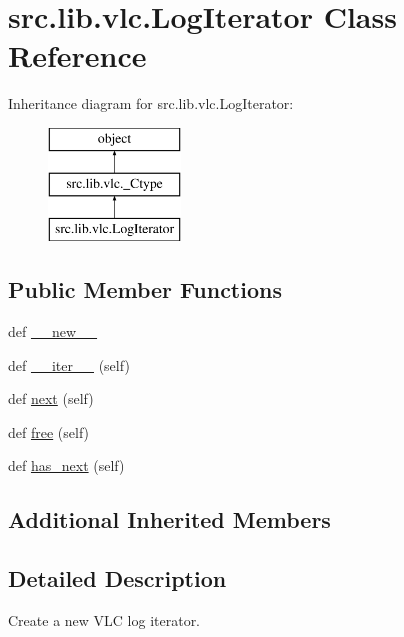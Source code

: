 \hypertarget{classsrc_1_1lib_1_1vlc_1_1LogIterator}{}\section{src.\+lib.\+vlc.\+Log\+Iterator Class Reference}
\label{classsrc_1_1lib_1_1vlc_1_1LogIterator}
Inheritance diagram for src.\+lib.\+vlc.\+Log\+Iterator\+:\begin{figure}[H]
\begin{center}
\leavevmode
\includegraphics[height=3.000000cm]{classsrc_1_1lib_1_1vlc_1_1LogIterator}
\end{center}
\end{figure}
\subsection*{Public Member Functions}
\begin{DoxyCompactItemize}
\item 
def \hyperlink{classsrc_1_1lib_1_1vlc_1_1LogIterator_a677329352d6e6b7b7aaa9ae45ce3760c}{\+\_\+\+\_\+new\+\_\+\+\_\+}
\item 
def \hyperlink{classsrc_1_1lib_1_1vlc_1_1LogIterator_ad949350940a5bbc05804b89492998c71}{\+\_\+\+\_\+iter\+\_\+\+\_\+} (self)
\item 
def \hyperlink{classsrc_1_1lib_1_1vlc_1_1LogIterator_a5a6891f2239e340184621b51e38e3707}{next} (self)
\item 
def \hyperlink{classsrc_1_1lib_1_1vlc_1_1LogIterator_adbf4e823143e56a33abc4d022041d348}{free} (self)
\item 
def \hyperlink{classsrc_1_1lib_1_1vlc_1_1LogIterator_a158a7ceb2b29b9800200cd5a8ee4ed23}{has\+\_\+next} (self)
\end{DoxyCompactItemize}
\subsection*{Additional Inherited Members}


\subsection{Detailed Description}
\begin{DoxyVerb}Create a new VLC log iterator.\end{DoxyVerb}
 

